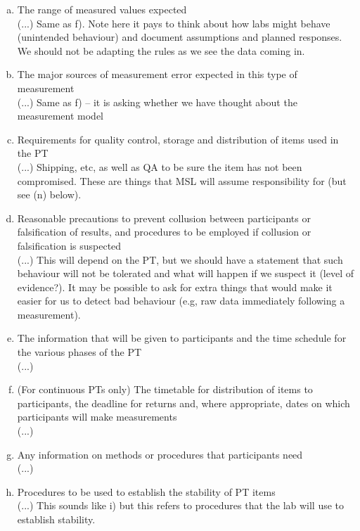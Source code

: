 \begin{enumerate}[a)]
\item	The range of measured values expected \\
(...) Same as f). Note here it pays to think about how labs might behave (unintended behaviour) and document assumptions and planned responses. We should not be adapting the rules as we see the data coming in. 

\item	The major sources of measurement error expected in this type of measurement \\
(...) Same as f) – it is asking whether we have thought about the measurement model

\item	Requirements for quality control, storage and distribution of items used in the PT \\
(...) Shipping, etc, as well as QA to be sure the item has not been compromised. These are things that MSL will assume responsibility for (but see (n) below).

\item	Reasonable precautions to prevent collusion between participants or falsification of results, and procedures to be employed if collusion or falsification is suspected  \\
(...) This will depend on the PT, but we should have a statement that such behaviour will not be tolerated and what will happen if we suspect it (level of evidence?). It may be possible to ask for extra things that would make it easier for us to detect bad behaviour (e.g, raw data immediately following a measurement).

\item	The information that will be given to participants and the time schedule for the various phases of the PT \\
(...) 

\item	(For continuous PTs only) The timetable for distribution of items to participants, the deadline for returns and, where appropriate, dates on which participants will make measurements \\
(...) 

\item	Any information on methods or procedures that participants need \\
(...) 

\item	Procedures to be used to establish the stability of PT items \\
(...)  This sounds like i) but this refers to procedures that the lab will use to establish stability.


\end{enumerate}
